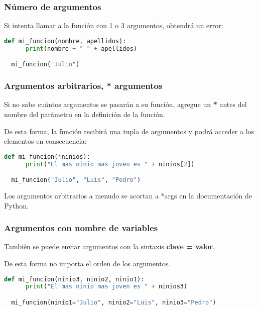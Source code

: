 \begin{frame}[fragile]
  \frametitle{Número de argumentos}

  Si intenta llamar a la función con 1 o 3 argumentos, obtendrá un error:

  \vspace{\baselineskip}
  \begin{lstlisting}[language=Python]
  def mi_funcion(nombre, apellidos):
      print(nombre + " " + apellidos)

  mi_funcion("Julio") 
  \end{lstlisting}
\end{frame}

\begin{frame}[fragile]
  \frametitle{Argumentos arbitrarios, * argumentos}

  \vspace{\baselineskip}
  Si no sabe cuántos argumentos se pasarán a su función,
  agregue un \textbf{*} antes del nombre del parámetro en la
  definición de la función.

  \vspace{\baselineskip}
  De esta forma, la función recibirá una tupla de argumentos
  y podrá acceder a los elementos en consecuencia: 

  \vspace{\baselineskip}
  \begin{lstlisting}[language=Python]
  def mi_funcion(*ninios):
      print("El mas ninio mas joven es " + ninios[2])

  mi_funcion("Julio", "Luis", "Pedro")
  \end{lstlisting}

  \pausa
  \begin{exampleblock}{}
    Los argumentos arbitrarios a menudo se acortan a *args en
    la documentación de Python.
  \end{exampleblock}
\end{frame}

\begin{frame}[fragile]
  \frametitle{Argumentos con nombre de variables}

  También se puede enviar argumentos con la sintaxis \textbf{clave = valor}.

  \vspace{\baselineskip}
  De esta forma no importa el orden de los argumentos. 

  \vspace{\baselineskip}
  \begin{lstlisting}[language=Python]
  def mi_funcion(ninio3, ninio2, ninio1):
      print("El mas ninio mas joven es " + ninios3)

  mi_funcion(ninio1="Julio", ninio2="Luis", ninio3="Pedro")
  \end{lstlisting}
\end{frame}

